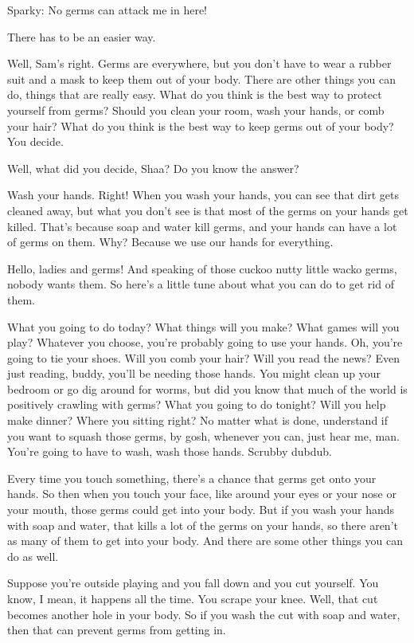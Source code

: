 Sparky: No germs can attack me in here!

There has to be an easier way.

Well, Sam's right. Germs are everywhere, but you don't have to wear a rubber suit and a mask to keep them out of your body. There are other things you can do, things that are really easy. What do you think is the best way to protect yourself from germs? Should you clean your room, wash your hands, or comb your hair? What do you think is the best way to keep germs out of your body? You decide.

Well, what did you decide, Shaa? Do you know the answer?

Wash your hands. Right! When you wash your hands, you can see that dirt gets cleaned away, but what you don't see is that most of the germs on your hands get killed. That's because soap and water kill germs, and your hands can have a lot of germs on them. Why? Because we use our hands for everything.

Hello, ladies and germs! And speaking of those cuckoo nutty little wacko germs, nobody wants them. So here's a little tune about what you can do to get rid of them.

What you going to do today? What things will you make? What games will you play? Whatever you choose, you're probably going to use your hands. Oh, you're going to tie your shoes. Will you comb your hair? Will you read the news? Even just reading, buddy, you'll be needing those hands. You might clean up your bedroom or go dig around for worms, but did you know that much of the world is positively crawling with germs? What you going to do tonight? Will you help make dinner? Where you sitting right? No matter what is done, understand if you want to squash those germs, by gosh, whenever you can, just hear me, man. You're going to have to wash, wash those hands. Scrubby dubdub.

Every time you touch something, there's a chance that germs get onto your hands. So then when you touch your face, like around your eyes or your nose or your mouth, those germs could get into your body. But if you wash your hands with soap and water, that kills a lot of the germs on your hands, so there aren't as many of them to get into your body. And there are some other things you can do as well.

Suppose you're outside playing and you fall down and you cut yourself. You know, I mean, it happens all the time. You scrape your knee. Well, that cut becomes another hole in your body. So if you wash the cut with soap and water, then that can prevent germs from getting in.

